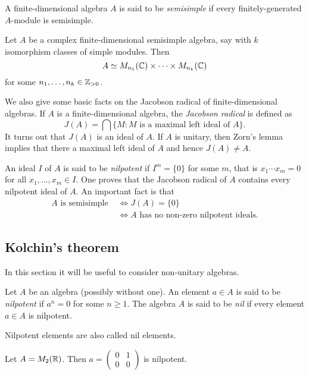 A finite-dimensional algebra $A$ is said to be \emph{semisimple} if
every finitely-generated $A$-module is semisimple. 

\begin{theorem}
Let $A$ be a complex finite-dimensional semisimple algebra, say with  
$k$ isomorphism classes of simple modules. Then 
\[
A\simeq M_{n_1}(\mathbb{C})\times\cdots\times M_{n_k}(\mathbb{C})
\]
for some $n_1,\dots,n_k\in\mathbb{Z}_{>0}$.
\end{theorem}

We also give some basic facts on the Jacobson radical
of finite-dimensional algebras. If $A$ is a finite-dimensional algebra, the \emph{Jacobson radical} is defined as 
\[
J(A)=\bigcap\{M:M\text{ is a maximal left ideal of $A$}\}. 
\]
It turns out that $J(A)$ is an ideal of $A$. If $A$ is
unitary, then Zorn's lemma implies that there a 
maximal left ideal of $A$ and hence $J(A)\ne A$. 

An ideal $I$ of $A$ is said to be \emph{nilpotent}
if $I^m=\{0\}$ for some $m$, that is 
$x_1\cdots x_m=0$ for all $x_1,\dots,x_m\in I$. 
One proves that the Jacobson radical of $A$ 
contains every nilpotent ideal of $A$. An important
fact is that 
\begin{align*}
A\text{ is semisimple }
&\Longleftrightarrow 
J(A)=\{0\}\\
&\Longleftrightarrow 
A\text{ has no non-zero nilpotent ideals}.
\end{align*}

\subsection{Kolchin's theorem}
\label{Kolchin}

In this section it will be useful to consider 
non-unitary algebras. 

\begin{definition}
    Let $A$ be an algebra (possibly without one). An element $a\in A$
    is said to be \emph{nilpotent} if 
    $a^n=0$ for some $n\geq1$. The algebra $A$ is said to be
    \emph{nil} if every element $a\in A$ is nilpotent. 
\end{definition}

Nilpotent elements are also called nil elements.  

\begin{example}
    Let $A=M_2(\mathbb{R})$. Then $a=\begin{pmatrix}0&1\\0&0\end{pmatrix}$ is nilpotent. 
\end{example}

